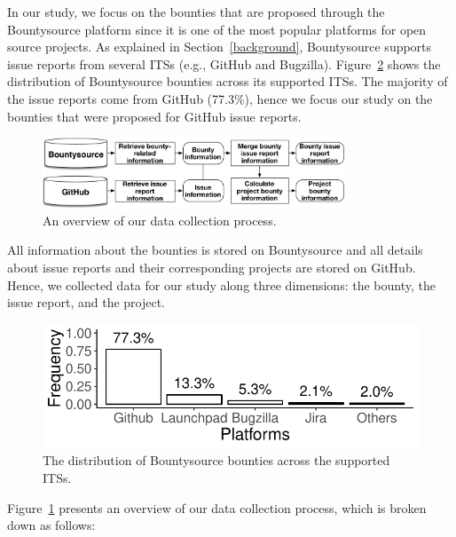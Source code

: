 

In our study, we focus on the bounties that are proposed through the Bountysource platform since it is one of the most popular platforms for open source projects. As explained in Section~\ref{background}, Bountysource supports issue reports from several ITSs (e.g.,  GitHub and Bugzilla). Figure~\ref{RatioOfIssuesITS} shows the distribution of Bountysource bounties across its supported ITSs. The majority of the issue reports come from GitHub (77.3\%), hence we focus our study on the bounties that were proposed for GitHub issue reports.




\begin{figure}[t]
    \centering\includegraphics[width=9cm]{pics/datacollection/data_collection.pdf}
  \caption{An overview of our data collection process.}
  \label{overview}
  \vspace{-0.1in}

\end{figure}




All information about the bounties is stored on Bountysource and all details about issue reports and their corresponding projects are stored on GitHub. Hence, we collected data for our study along three dimensions: the bounty, the issue report, and the project.

\begin{figure}[t]
\centering\includegraphics[width=0.8\columnwidth ]{pics/bg/RatioOfIssuesITS}
  \caption{The distribution of Bountysource bounties across the supported ITSs.}
  \label{RatioOfIssuesITS}
  \vspace{-0.1in}

\end{figure}

Figure~\ref{overview} presents an overview of our data collection process, which is broken down as follows:


